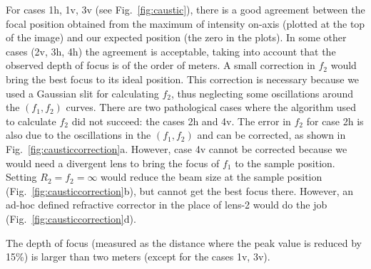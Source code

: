 \documentclass{iucr}              %
\begin{document}
For cases 1h, 1v, 3v (see  Fig.~\ref{fig:caustic}), there is a good agreement between the focal position obtained from the maximum of intensity on-axis (plotted at the top of the image) and our expected position (the zero in the plots). In some other cases (2v, 3h, 4h) the agreement is acceptable, taking into account that the observed depth of focus is of the order of meters. A small correction in $f_2$ would bring the best focus to its ideal position. This correction is necessary because we used a Gaussian slit for calculating $f_2$, thus neglecting some oscillations around the $(f_1,f_2)$ curves. There are two pathological cases where the algorithm used to calculate $f_2$ did not succeed: the cases 2h and 4v.
The error in $f_2$  for case 2h is also due to the oscillations in the $(f_1,f_2)$ and can be corrected, as shown in Fig.~\ref{fig:causticcorrection}a. However, case 4v cannot be corrected because we would need a divergent lens to bring the focus of $f_1$ to the sample position. Setting $R_2=f_2=\infty$ would reduce the beam size at the sample position (Fig.~\ref{fig:causticcorrection}b), but cannot get the best focus there. However, an ad-hoc defined refractive corrector in the place of lens-2 would do the job (Fig.~\ref{fig:causticcorrection}d).  

The depth of focus (measured as the distance where the peak value is reduced by 15\%) is larger than two meters (except for the cases 1v, 3v). 



\end{document}
